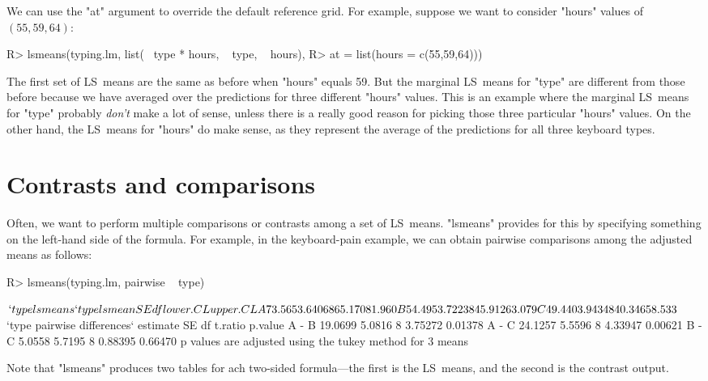 \documentclass{article}
\begin{document}
We can use the "at" argument to override the default reference grid. For example, suppose we want to consider "hours" values of $(55,59,64)$:
\begin{Winput}
R> lsmeans(typing.lm, list(~ type * hours, ~ type, ~ hours),
R>     at = list(hours = c(55,59,64)))
\end{Winput}
The first set of LS~means are the same as before when "hours" equals 59. But the marginal LS~means for "type" are different from those before because we have averaged over the predictions for three different "hours" values. This is an example where the marginal LS~means for "type" probably \emph{don't} make a lot of sense, unless there is a really good reason for picking those three particular "hours" values. On the other hand, the LS~means for "hours" do make sense, as they represent the average of the predictions for all three keyboard types.


\section{Contrasts and comparisons}
Often, we want to perform multiple comparisons or contrasts among a set of LS~means. "lsmeans" provides for this by specifying something on the left-hand side of the formula. For example, in the keyboard-pain example, we can obtain pairwise comparisons among the adjusted means as follows:
\begin{Winput}
R> lsmeans(typing.lm, pairwise ~ type)
\end{Winput}
\begin{Woutput}
$`type lsmeans`
 type lsmean     SE df lower.CL upper.CL
    A 73.565 3.6406  8   65.170   81.960
    B 54.495 3.7223  8   45.912   63.079
    C 49.440 3.9434  8   40.346   58.533

$`type pairwise differences`
      estimate     SE df t.ratio p.value
A - B  19.0699 5.0816  8 3.75272 0.01378
A - C  24.1257 5.5596  8 4.33947 0.00621
B - C   5.0558 5.7195  8 0.88395 0.66470
    p values are adjusted using the tukey method for 3 means
\end{Woutput}
Note that "lsmeans" produces two tables for ach two-sided formula---the first is the LS~means, and the second is the contrast output. 
\end{document}
